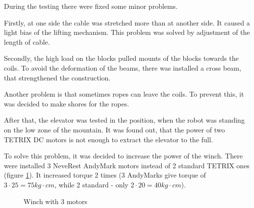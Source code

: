 \begin{enumerate*}
  During the testing there were fixed some minor problems.
  \begin{enumerate*}
  	
  	\item Firstly, at one side the cable was stretched more than at another side. It caused a light bias of the lifting mechanism. This problem was solved by adjustment of the length of cable.
  	
  	\item Secondly, the high load on the blocks pulled mounts of the blocks towards the coils. To avoid the deformation of the beams, there was installed a cross beam, that strengthened the construction.
  	
  	\item Another problem is that sometimes ropes can leave the coils. To prevent this, it was decided to make shores for the ropes.
  	
  \end{enumerate*}

  \item After that, the elevator was tested in the position, when the robot was standing on the low zone of the mountain. It was found out, that the power of two TETRIX DC motors is not enough to extract the elevator to the full.

  To solve this problem, it was decided to increase the power of the winch. There were installed 3 NeveRest AndyMark motors instead of 2 standard TETRIX ones (figure \ref{Elevator1004}). It increased torque 2 times (3 AndyMarks give torque of $3 \cdot 25 = 75kg \cdot cm$, while 2 standard - only $2 \cdot 20 = 40kg \cdot cm$).
  
  \begin{figure}[H]
  	\begin{minipage}[h]{1\linewidth}
  		\caption{Winch with 3 motors}
  		\label{Elevator1004}
  	\end{minipage}
  \end{figure}


\end{enumerate*}
